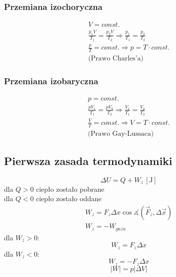 \documentclass{article}
\numberwithin{equation}{section}
\newcommand{\unit}[1]{\, \left[\mathrm{#1}\right]}
\begin{document}
      \subsubsection{Przemiana izochoryczna}
        \begin{gather}
          V = const.\\
          \frac{p_1V}{T_1} = \frac{p_2V}{T_2} \Rightarrow \frac{p_1}{T_1} = \frac{p_2}{T_2}\\
          \frac{p}{T} = const. \Rightarrow p = T\cdot const.\\\text{(Prawo Charles'a)}
        \end{gather}
      \subsubsection{Przemiana izobaryczna}
        \begin{gather}
          p = const.\\
          \frac{pV_1}{T_1} = \frac{pV_2}{T_2} \Rightarrow \frac{V_1}{T_1} = \frac{V_2}{T_2}\\
          \frac{V}{T} = const. \Rightarrow V = T\cdot const.\\
          \text{(Prawo Gay-Lussaca)}
        \end{gather}
    \subsection{Pierwsza zasada termodynamiki}
      \begin{equation}
        \Delta U = Q + W_z \unit{J}
      \end{equation}
      dla $Q > 0$ ciepło zostało pobrane\\
      dla $Q < 0$ ciepło zostało oddane
      \begin{gather}
        W_z = F_z\Delta x\cos\measuredangle (\vec F_z, \Delta\vec x)\\
        W_z = -W_{gazu}
      \end{gather}
      dla $W_z > 0$:
      \begin{equation}
        W_z = F_z\Delta x
      \end{equation}
      dla $W_z < 0$:
      \begin{equation}
        W_z = -F_z\Delta x
      \end{equation}
      \begin{equation}
        |W| = p|\Delta V|
      \end{equation}
\end{document}
